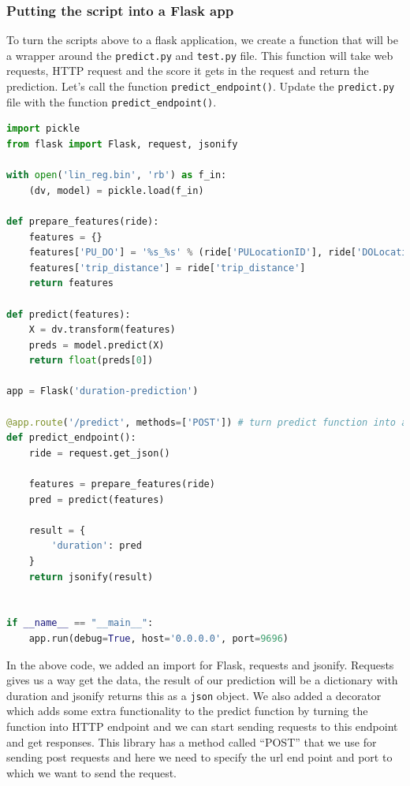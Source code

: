 \documentclass[letterpaper,12pt,notitlepage,twoside]{report}
\begin{document}
\subsubsection{Putting the script into a Flask app}
To turn the scripts above to a flask application, we create a function that will be a wrapper around the \texttt{predict.py} and \texttt{test.py} file. This function will take web requests, HTTP request and the score it gets in the request and return the prediction. Let's call the function \texttt{predict\_endpoint()}. Update the \texttt{predict.py} file with the function \texttt{predict\_endpoint()}.

\begin{lstlisting}[language=python, numbers=none]
import pickle
from flask import Flask, request, jsonify

with open('lin_reg.bin', 'rb') as f_in:
    (dv, model) = pickle.load(f_in)

def prepare_features(ride):
    features = {}
    features['PU_DO'] = '%s_%s' % (ride['PULocationID'], ride['DOLocationID'])
    features['trip_distance'] = ride['trip_distance']
    return features

def predict(features):
    X = dv.transform(features)
    preds = model.predict(X)
    return float(preds[0])
  
app = Flask('duration-prediction')

@app.route('/predict', methods=['POST']) # turn predict function into an endpoint
def predict_endpoint():
    ride = request.get_json()

    features = prepare_features(ride)
    pred = predict(features)

    result = {
        'duration': pred
    }
    return jsonify(result)


if __name__ == "__main__":
    app.run(debug=True, host='0.0.0.0', port=9696)
\end{lstlisting}
In the above code, we added an import for Flask, requests and jsonify. Requests gives us a way get the data,  the result of our prediction will be a dictionary with duration and jsonify returns this as a \texttt{json} object. We also added a decorator which adds some extra functionality to the predict function by turning the function into HTTP endpoint and we can start sending requests to this endpoint and get responses.  This library has a method called ``POST'' that we use for sending post requests and here we need to specify the url end point and port to which we want to send the request.
\end{document}
